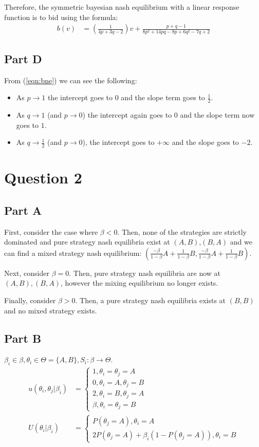 \documentclass[11pt]{article} %
\begin{document}
Therefore, the symmetric bayesian nash equilibrium with a linear response function is to bid using the formula:
\begin{align}
b(v) &= \left(  \frac{1}{4p + 3q -2}\right)v + \frac{p+q-1}{8p^2 + 14pq -8p + 6q^2 - 7q +2} \label{eqn:bne}
\end{align}
\subsection{Part D}
From (\ref{eqn:bne}) we can see the following:
\begin{itemize}
\item As $p\rightarrow 1$ the intercept goes to 0 and the slope term goes to $\frac{1}{2}$.
\item As $q\rightarrow 1$ (and $p\rightarrow0$) the intercept again goes to 0 and the slope term now goes to $1$.
\item As $q\rightarrow \frac{1}{2}$ (and $p\rightarrow0$), the intercept goes to $+\infty$ and the slope goes to $-2$.
\end{itemize}
\section{Question 2}
\subsection{Part A}
First, consider the case where $\beta<0.$ Then, none of the strategies are strictly dominated and pure strategy nash equilibria exist at $(A,B)$,$(B,A)$ and we can find a mixed strategy nash equilibrium: $(\frac{-\beta}{1-\beta}A + \frac{1}{1-\beta}B ,\frac{-\beta}{1-\beta}A + \frac{1}{1-\beta}B)$.

Next, consider $\beta = 0.$ Then, pure strategy nash equilibria are now at $(A,B),(B,A)$, however the mixing equilibrium no longer exists.

Finally, consider $\beta>0$. Then, a pure strategy nash equilibria exists at $(B,B)$ and no mixed strategy exists. 
\subsection{Part B}
$\beta_i \in \beta, \theta_i \in \Theta = \{ A,B\}, S_i: \beta \rightarrow \Theta$.
\begin{align*}
u(\theta_i,\theta_j|\beta_i) &= \begin{cases} 1,\theta_i = \theta_j = A \\ 0,\theta_i = A, \theta_j = B \\ 2,\theta_i = B, \theta_j = A\\ \beta,\theta_i = \theta_j = B \end{cases}\\
U(\theta_i|\beta_i) &= \begin{cases} P(\theta_j = A), \theta_i = A \\ 2P(\theta_j = A) +\beta_i(1-P(\theta_j=A)) , \theta_i=B\end{cases} 
\end{align*}
\end{document}

